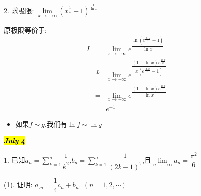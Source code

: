 2. 求极限: $\lim\limits_{x\rightarrow+\infty}(x^{\frac{1}{x}}-1)^{\frac{1}{\ln x}}$
\begin{solution}
	
	原极限等价于: 
	\begin{eqnarray*}
		I&=&\lim\limits_{x\rightarrow+\infty}e^{\dfrac{\ln(e^{\frac{\ln x}{x}}-1)}{\ln x}}\\
		&\overset{L}{=}&\lim\limits_{x\rightarrow+\infty}e^{\dfrac{(1-\ln x)e^{\frac{\ln x}{x}}}{x(e^{\frac{\ln x}{x}}-1)}}\\
		&=&\lim\limits_{x\rightarrow+\infty}e^{\dfrac{(1-\ln x)e^{\frac{\ln x}{x}}}{\ln x}}\\
		&=&e^{-1}
	\end{eqnarray*}
	\begin{anymark}[注]
		\begin{itemize}
			\item 如果$f\sim g$,我们有$\ln f\sim \ln g$
		\end{itemize}
	\end{anymark}
\end{solution}

\hl{\textbf{\textit{July 4}}}

1. 已知$a_{n}=\sum\limits_{k=1}^{n}\dfrac{1}{k^2}$,$b_{n}=\sum\limits_{k=1}^{n}\dfrac{1}{(2k-1)^2}$,且$\lim\limits_{n\rightarrow +\infty}a_{n}=\dfrac{\pi^2}{6}$

(1). 证明: $a_{2n}=\dfrac{1}{4}a_{n}+b_{n},\ (n=1,2,\cdots)$


